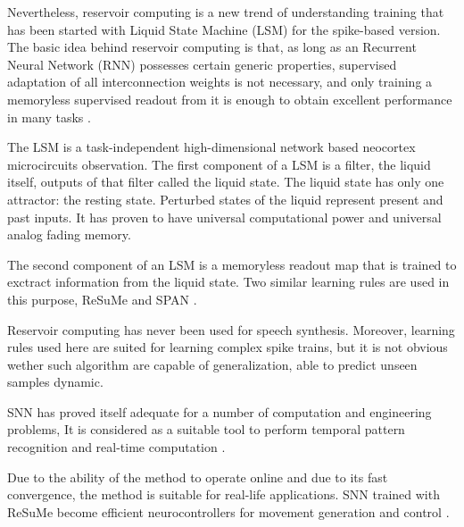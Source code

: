 \documentclass[letterpaper, 10 pt, conference]{ieeeconf}  %
\begin{document}
Nevertheless, reservoir computing is a new trend of understanding training that has been started with Liquid State Machine (LSM) \cite{maass2002real} for the spike-based version. The basic idea behind reservoir computing is that, as long as an Recurrent Neural Network (RNN) possesses certain generic properties, supervised adaptation of all interconnection weights is not necessary, and only training a memoryless supervised readout from it is enough to obtain excellent performance in many tasks \cite{lukovsevivcius2012reservoir}.

The LSM is a task-independent high-dimensional network based neocortex microcircuits observation. The first component of a LSM is a filter, the liquid itself, outputs of that filter called the liquid state. The liquid state has only one attractor: the resting state. Perturbed states of the liquid represent present and past inputs. It has proven to have universal computational power and universal analog fading memory.

The second component of an LSM is a memoryless readout map that is trained to exctract information from the liquid state. Two similar learning rules are used in this purpose, ReSuMe \cite{ponulak2010supervised, ponulak2006supervised} and SPAN \cite{mohemmed2012span, mohemmed2013training}.

Reservoir computing has never been used for speech synthesis. Moreover, learning rules used here are suited for learning complex spike trains, but it is not obvious wether such algorithm are capable of generalization, able to predict unseen samples dynamic.



SNN has proved itself adequate for a number of computation and engineering problems, It is considered as a suitable tool to perform temporal pattern recognition and real-time computation \cite{mohemmed2012span}.

Due to the ability of the method to operate online and due to its fast convergence, the method is suitable for real-life applications. SNN trained with ReSuMe become efficient neurocontrollers for movement generation and control \cite{ponulak2010supervised}.



\addtolength{\textheight}{-12cm}   %
\end{document}
